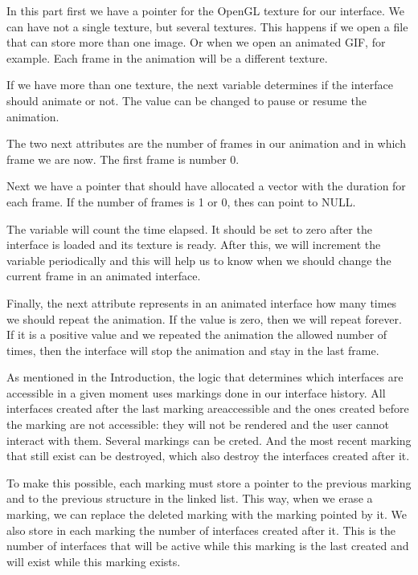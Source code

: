 In this part first we have a pointer for the OpenGL texture for our
interface. We can have not a single texture, but several
textures. This happens if we open a file that can store more than one
image. Or when we open an animated GIF, for example. Each frame in the
animation will be a different texture.

If we have more than one texture, the next variable determines if the
interface should animate or not. The value can be changed to pause or
resume the animation.

The two next attributes are the number of frames in our animation and
in which frame we are now. The first frame is number 0.

Next we have a pointer that should have allocated a vector with the
duration for each frame. If the number of frames is 1 or 0, thes can
point to NULL.

The variable  will count the time elapsed. It should be
set to zero after the interface is loaded and its texture is
ready. After this, we will increment the variable periodically and
this will help us to know when we should change the current frame in
an animated interface.

Finally, the next attribute represents in an animated interface how
many times we should repeat the animation. If the value is zero, then
we will repeat forever. If it is a positive value and we repeated the
animation the allowed number of times, then the interface will stop
the animation and stay in the last frame.


As mentioned in the Introduction, the logic that determines which
interfaces are accessible in a given moment uses markings done in our
interface history. All interfaces created after the last marking
areaccessible and the ones created before the marking are not
accessible: they will not be rendered and the user cannot interact
with them. Several markings can be creted. And the most recent marking
that still exist can be destroyed, which also destroy the interfaces
created after it.

To make this possible, each marking must store a pointer to the
previous marking and to the previous structure in the linked
list. This way, when we erase a marking, we can replace the deleted
marking with the marking pointed by it. We also store in each marking
the number of interfaces created after it. This is the number of
interfaces that will be active while this marking is the last created
and will exist while this marking exists.


